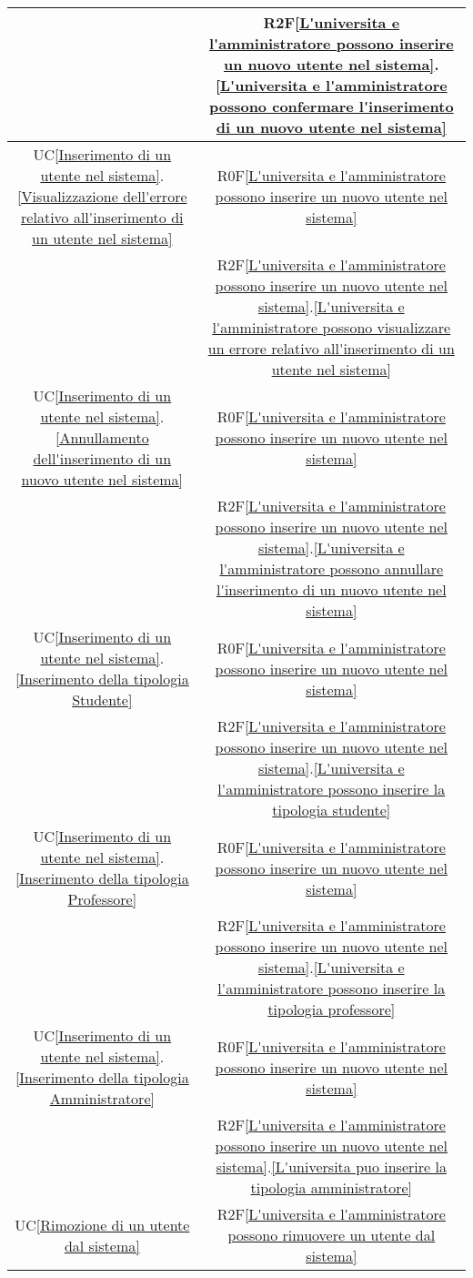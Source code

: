 \begin{longtable}{|c|c|}
& R2F\ref{L'universita e l'amministratore possono inserire un nuovo utente nel sistema}.\ref{L'universita e l'amministratore possono confermare l'inserimento di un nuovo utente nel sistema}\\
\hline
UC\ref{Inserimento di un utente nel sistema}.\ref{Visualizzazione dell'errore relativo all'inserimento di un utente nel sistema} & R0F\ref{L'universita e l'amministratore possono inserire un nuovo utente nel sistema}\\
& R2F\ref{L'universita e l'amministratore possono inserire un nuovo utente nel sistema}.\ref{L'universita e l'amministratore possono visualizzare un errore relativo all'inserimento di un utente nel sistema}\\
\hline
UC\ref{Inserimento di un utente nel sistema}.\ref{Annullamento dell'inserimento di un nuovo utente nel sistema} & R0F\ref{L'universita e l'amministratore possono inserire un nuovo utente nel sistema}\\
& R2F\ref{L'universita e l'amministratore possono inserire un nuovo utente nel sistema}.\ref{L'universita e l'amministratore possono annullare l'inserimento di un nuovo utente nel sistema}\\
\hline
UC\ref{Inserimento di un utente nel sistema}.\ref{Inserimento della tipologia Studente} & R0F\ref{L'universita e l'amministratore possono inserire un nuovo utente nel sistema}\\
& R2F\ref{L'universita e l'amministratore possono inserire un nuovo utente nel sistema}.\ref{L'universita e l'amministratore possono inserire la tipologia studente}\\
\hline
UC\ref{Inserimento di un utente nel sistema}.\ref{Inserimento della tipologia Professore} & R0F\ref{L'universita e l'amministratore possono inserire un nuovo utente nel sistema}\\
& R2F\ref{L'universita e l'amministratore possono inserire un nuovo utente nel sistema}.\ref{L'universita e l'amministratore possono inserire la tipologia professore}\\
\hline
UC\ref{Inserimento di un utente nel sistema}.\ref{Inserimento della tipologia Amministratore} & R0F\ref{L'universita e l'amministratore possono inserire un nuovo utente nel sistema}\\
& R2F\ref{L'universita e l'amministratore possono inserire un nuovo utente nel sistema}.\ref{L'universita puo inserire la tipologia amministratore}\\
\hline
UC\ref{Rimozione di un utente dal sistema} & R2F\ref{L'universita e l'amministratore possono rimuovere un utente dal sistema}\\

\end{longtable}
